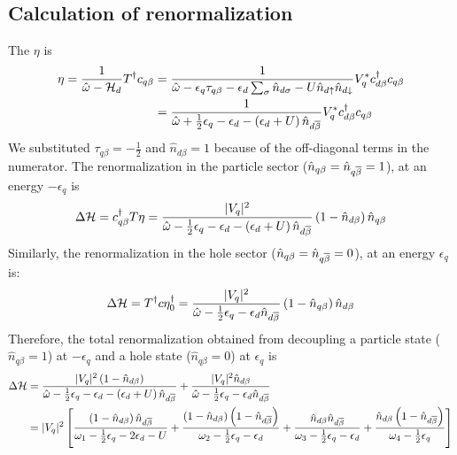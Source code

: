 \documentclass[12pt,twoside]{report}
\numberwithin{equation}{section}
\begin{document}
\subsection{Calculation of renormalization}
The \(\eta\) is
\begin{equation}\begin{aligned}
	\eta = \frac{1}{\hat \omega - \mathcal{H}_d}T^\dagger c_{q\beta} &= \frac{1}{\hat \omega - \epsilon_q \tau_{q\beta} - \epsilon_{d}\sum_\sigma  \hat n_{d\sigma} -  U \hat n_{d\uparrow} \hat n_{d\downarrow}}V_q^* c^\dagger_{d\beta}c_{q\beta}\\
							     &= \frac{1}{\hat \omega + \frac{1}{2}\epsilon_q - \epsilon_d - \left(\epsilon_d + U \right)\hat n_{d\overline\beta}}V_q^* c^\dagger_{d\beta}c_{q\beta}
\end{aligned}\end{equation}
We substituted \(\tau_{q\beta} = -\frac{1}{2}\) and \(\hat n_{d\beta} = 1\) because of the off-diagonal terms in the numerator.
The renormalization in the particle sector (\(\hat n_{q\beta} = \hat n_{q\overline\beta} = 1\)), at an energy \(-\epsilon_q\) is
\begin{equation}\begin{aligned}
\Delta \mathcal{H} = c^\dagger_{q\beta} T \eta= \frac{|V_q|^2}{\hat \omega - \frac{1}{2}\epsilon_q - \epsilon_d - \left(\epsilon_d + U \right)\hat n_{d\overline\beta}} \left(1 - \hat n_{d\beta}\right)\hat n_{q\beta} 
\end{aligned}\end{equation}
Similarly, the renormalization in the hole sector (\(\hat n_{q\beta} = \hat n_{q\overline\beta} = 0\)), at an energy \(\epsilon_q\) is:
\begin{equation}
	\Delta \mathcal{H} = T^\dagger c \eta_0^\dagger = \frac{|V_q|^2}{\hat \omega - \frac{1}{2}\epsilon_q - \epsilon_d\hat n_{d\overline\beta}}\left(1 - \hat n_{q\beta}\right)\hat n_{d\beta}
\end{equation}
Therefore, the total renormalization obtained from decoupling a particle state (\(\hat n_{q\beta}=1\)) at \(-\epsilon_q\) and a hole state (\(\hat n_{q\beta}=0\)) at \(\epsilon_q\) is
\begin{equation}\begin{aligned}
	\Delta \mathcal{H} &= \frac{|V_q|^2 \left(1 - \hat n_{d\beta}\right)}{\hat \omega - \frac{1}{2}\epsilon_q - \epsilon_d - \left(\epsilon_d + U \right)\hat n_{d\overline\beta}} + \frac{|V_q|^2\hat n_{d\beta}}{\hat \omega - \frac{1}{2}\epsilon_q - \epsilon_d \hat n_{d\overline\beta}}\\
		    &=|V_q|^2 \left[\frac{\left(1 - \hat n_{d\beta}\right)\hat n_{d\overline\beta}}{\omega_1 - \frac{1}{2}\epsilon_q - 2\epsilon_d - U} + \frac{\left(1 - \hat n_{d\beta}\right)\left( 1-\hat n_{d\overline\beta} \right)}{\omega_2 - \frac{1}{2}\epsilon_q - \epsilon_d} + \frac{\hat n_{d\beta} \hat n_{d\overline\beta}}{\omega_3 - \frac{1}{2}\epsilon_q - \epsilon_d} + \frac{\hat n_{d\beta}\left( 1- \hat n_{d\overline\beta}\right) }{\omega_4 - \frac{1}{2}\epsilon_q}\right]\\
\end{aligned}\end{equation}
\end{document}

